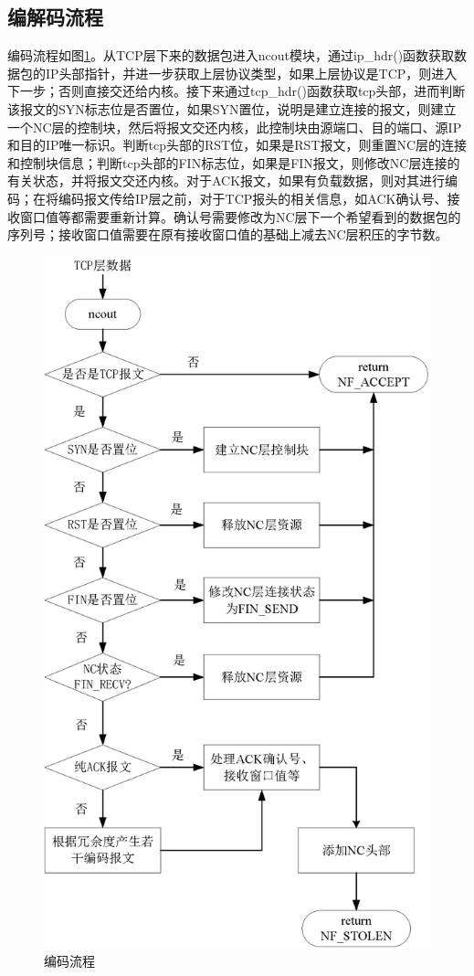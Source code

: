 \subsection{编解码流程}%
编码流程如图\ref{BIANMALC_EPS}。从TCP层下来的数据包进入ncout模块，通过ip\_hdr()函数获取数据包的IP头部指针，并进一步获取上层协议类型，如果上层协议是TCP，则进入下一步；否则直接交还给内核。接下来通过tcp\_hdr()函数获取tcp头部，进而判断该报文的SYN标志位是否置位，如果SYN置位，说明是建立连接的报文，则建立一个NC层的控制块，然后将报文交还内核，此控制块由源端口、目的端口、源IP和目的IP唯一标识。判断tcp头部的RST位，如果是RST报文，则重置NC层的连接和控制块信息；判断tcp头部的FIN标志位，如果是FIN报文，则修改NC层连接的有关状态，并将报文交还内核。对于ACK报文，如果有负载数据，则对其进行编码；在将编码报文传给IP层之前，对于TCP报头的相关信息，如ACK确认号、接收窗口值等都需要重新计算。确认号需要修改为NC层下一个希望看到的数据包的序列号；接收窗口值需要在原有接收窗口值的基础上减去NC层积压的字节数。
\begin{figure}[htbp] 
	\centering
	\includegraphics[width=5in]{figures/encodelc.eps}
	\caption{编码流程}
	\label{BIANMALC_EPS}
\end{figure}
